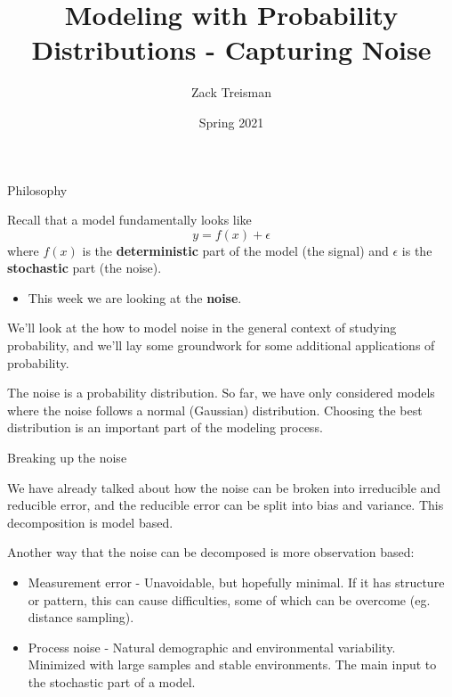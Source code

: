 \documentclass[
  ignorenonframetext,
]{beamer}
\title{Modeling with Probability Distributions - Capturing Noise}
\author{Zack Treisman}
\date{Spring 2021}
\providecommand{\tightlist}{%
  \setlength{\itemsep}{0pt}\setlength{\parskip}{0pt}}
\begin{document}
\frame{\titlepage}

\begin{frame}{Philosophy}
\protect\hypertarget{philosophy}{}

Recall that a model fundamentally looks like \[
y=f(x)+\epsilon
\] where \(f(x)\) is the \textbf{deterministic} part of the model (the
signal) and \(\epsilon\) is the \textbf{stochastic} part (the noise).

\begin{itemize}
\tightlist
\item
  This week we are looking at the \textbf{noise}.
\end{itemize}

We'll look at the how to model noise in the general context of studying
probability, and we'll lay some groundwork for some additional
applications of probability.

The noise is a probability distribution. So far, we have only considered
models where the noise follows a normal (Gaussian) distribution.
Choosing the best distribution is an important part of the modeling
process.

\end{frame}

\begin{frame}{Breaking up the noise}
\protect\hypertarget{breaking-up-the-noise}{}

We have already talked about how the noise can be broken into
irreducible and reducible error, and the reducible error can be split
into bias and variance. This decomposition is model based.

Another way that the noise can be decomposed is more observation based:

\begin{itemize}
\tightlist
\item
  Measurement error - Unavoidable, but hopefully minimal. If it has
  structure or pattern, this can cause difficulties, some of which can
  be overcome (eg. distance sampling).
\item
  Process noise - Natural demographic and environmental variability.
  Minimized with large samples and stable environments. The main input
  to the stochastic part of a model.
\end{itemize}

\end{frame}
\end{document}
